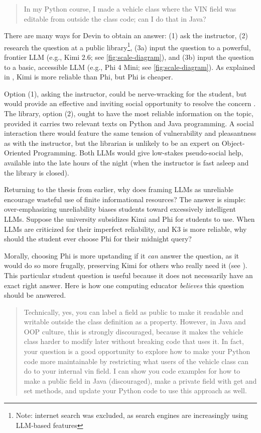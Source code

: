 \begin{quote}
In my Python course, I made a vehicle class where the VIN field was editable from outside the class code; can I do that in Java?
\end{quote}

There are many ways for Devin to obtain an answer: (1) ask the instructor, (2) research the question at a public library\footnote{Note: internet search was excluded, as search engines are increasingly using LLM-based features}, (3a) input the question to a powerful, frontier LLM (e.g., Kimi 2.6; see \autoref{fig:scale-diagram}), and (3b) input the question to a basic, accessible LLM (e.g., Phi 4 Mini; see \autoref{fig:scale-diagram}). As explained in , Kimi is more reliable than Phi, but Phi is cheaper.

Option (1), asking the instructor, could be nerve-wracking for the student, but would provide an effective and inviting social opportunity to resolve the concern \cite{fanImpactAIassistedPair2025,gardellaHBCUStudentPerspectives2025}. The library, option (2), ought to have the most reliable information on the topic, provided it carries two relevant texts on Python and Java programming. A social interaction there would feature the same tension of vulnerability and pleasantness as with the instructor, but the librarian is unlikely to be an expert on Object-Oriented Programming. Both LLMs would give low-stakes pseudo-social help, available into the late hours of the night (when the instructor is fast asleep and the library is closed).

Returning to the thesis from earlier, why does framing LLMs as unreliable encourage wasteful use of finite informational resources? The answer is simple: over-emphasizing unreliability biases students toward excessively intelligent LLMs. Suppose the university subsidizes Kimi and Phi for students to use. When LLMs are criticized for their imperfect reliability, and K3 is more reliable, why should the student ever choose Phi for their midnight query?

Morally, choosing Phi is more upstanding if it \emph{can} answer the question, as it would do so more frugally, preserving Kimi for others who really need it (see ). This particular student question is useful because it does not necessarily have an exact right answer. Here is how one computing educator \emph{believes} this question should be answered.

\begin{quote}
Technically, yes, you can label a field as public to make it readable and writable outside the class definition as a property. However, in Java and OOP culture, this is strongly discouraged, because it makes the vehicle class harder to modify later without breaking code that uses it. In fact, your question is a good opportunity to explore how to make your Python code more maintainable by restricting what users of the vehicle class can do to your internal vin field. I can show you code examples for how to make a public field in Java (discouraged), make a private field with get and set methods, and update your Python code to use this approach as well.
\end{quote}

